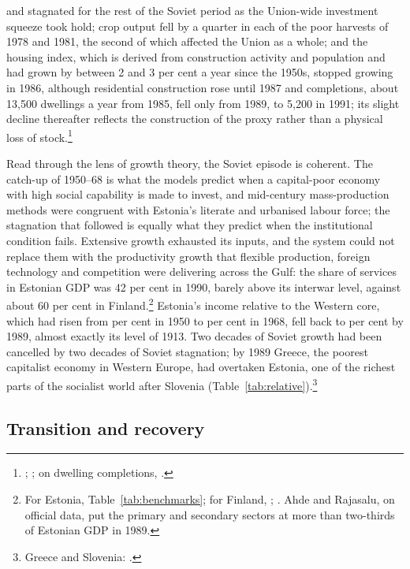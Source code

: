  and stagnated for the rest of the Soviet period as the Union-wide investment squeeze took hold; crop output fell by a quarter in each of the poor harvests of 1978 and 1981, the second of which affected the Union as a whole; and the housing index, which is derived from construction activity and population and had grown by between 2 and 3 per cent a year since the 1950s, stopped growing in 1986, although residential construction rose until 1987 and completions, about 13,500 dwellings a year from 1985, fell only from 1989, to 5,200 in 1991; its slight decline thereafter reflects the construction of the proxy rather than a physical loss of stock.\footnote{\autocite[134--50]{hanson2003}; \autocite[60, 62]{ahderajasalu1992}; on dwelling completions, \autocite[216]{wb1993estonia}.}

Read through the lens of growth theory, the Soviet episode is coherent. The catch-up of 1950--68 is what the models predict when a capital-poor economy with high social capability is made to invest, and mid-century mass-production methods were congruent with Estonia's literate and urbanised labour force; the stagnation that followed is equally what they predict when the institutional condition fails. Extensive growth exhausted its inputs, and the system could not replace them with the productivity growth that flexible production, foreign technology and competition were delivering across the Gulf: the share of services in Estonian GDP was 42 per cent in 1990, barely above its interwar level, against about 60 per cent in Finland.\footnote{For Estonia, Table~\ref{tab:benchmarks}; for Finland, \autocite[11--12]{ahderajasalu1992}; \autocite[25]{klimantas2026soviet}. Ahde and Rajasalu, on official data, put the primary and secondary sectors at more than two-thirds of Estonian GDP in 1989.} Estonia's income relative to the Western core, which had risen from  per cent in 1950 to  per cent in 1968, fell back to  per cent by 1989, almost exactly its level of 1913. Two decades of Soviet growth had been cancelled by two decades of Soviet stagnation; by 1989 Greece, the poorest capitalist economy in Western Europe, had overtaken Estonia, one of the richest parts of the socialist world after Slovenia (Table~\ref{tab:relative}).\footnote{Greece and Slovenia: \autocite{mpd2023}.}

\subsection{Transition and recovery}

